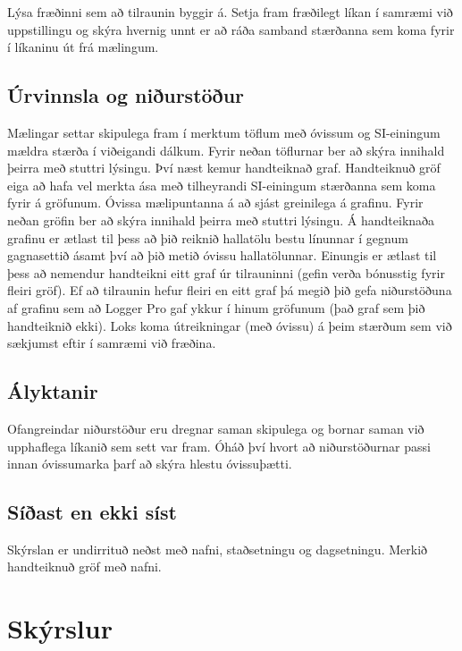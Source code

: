 Lýsa fræðinni sem að tilraunin byggir á. Setja fram fræðilegt líkan í samræmi við uppstillingu og skýra hvernig unnt er að ráða samband stærðanna sem koma fyrir í líkaninu út frá mælingum.

\subsection*{Úrvinnsla og niðurstöður} 

Mælingar settar skipulega fram í merktum töflum með óvissum og SI-einingum mældra stærða í viðeigandi dálkum. Fyrir neðan töflurnar ber að skýra innihald þeirra með stuttri lýsingu. Því næst kemur handteiknað graf. Handteiknuð gröf eiga að hafa vel merkta ása með tilheyrandi SI-einingum stærðanna sem koma fyrir á gröfunum. Óvissa mælipuntanna á að sjást greinilega á grafinu. Fyrir neðan gröfin ber að skýra innihald þeirra með stuttri lýsingu. Á handteiknaða grafinu er ætlast til þess að þið reiknið hallatölu bestu línunnar í gegnum gagnasettið ásamt því að þið metið óvissu hallatölunnar. Einungis er ætlast til þess að nemendur handteikni eitt graf úr tilrauninni (gefin verða bónusstig fyrir fleiri gröf). Ef að tilraunin hefur fleiri en eitt graf þá megið þið gefa niðurstöðuna af grafinu sem að Logger Pro gaf ykkur í hinum gröfunum (það graf sem þið handteiknið ekki). Loks koma útreikningar (með óvissu) á þeim stærðum sem við sækjumst eftir í samræmi við fræðina.

\subsection*{Ályktanir}

Ofangreindar niðurstöður eru dregnar saman skipulega og bornar saman við upphaflega líkanið sem sett var fram. Óháð því hvort að niðurstöðurnar passi innan óvissumarka þarf að skýra hlestu óvissuþætti.

\subsection*{Síðast en ekki síst}

Skýrslan er undirrituð neðst með nafni, staðsetningu og dagsetningu. Merkið handteiknuð gröf með nafni.


\newpage

\section*{Skýrslur}

